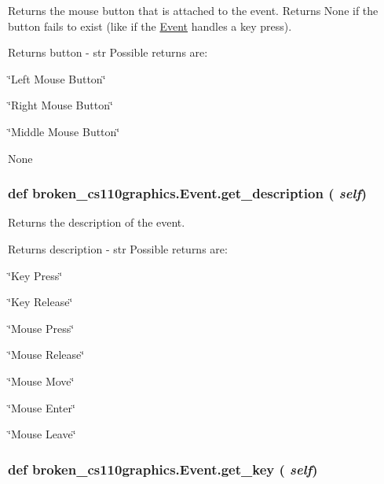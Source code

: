 Returns the mouse button that is attached to the event. Returns None if the button fails to exist (like if the \hyperlink{classbroken__cs110graphics_1_1Event}{Event} handles a key press). \begin{DoxyReturn}{Returns}
button -\/ str Possible returns are:
\begin{DoxyItemize}
\item \char`\"{}Left Mouse Button\char`\"{}
\item \char`\"{}Right Mouse Button\char`\"{}
\item \char`\"{}Middle Mouse Button\char`\"{}
\item None 
\end{DoxyItemize}
\end{DoxyReturn}
\hypertarget{classbroken__cs110graphics_1_1Event_a47c288b956b80e4670efe13d68aeb72b}{
\subsubsection[{get\_\-description}]{\setlength{\rightskip}{0pt plus 5cm}def broken\_\-cs110graphics.Event.get\_\-description ( {\em self})}}
\label{classbroken__cs110graphics_1_1Event_a47c288b956b80e4670efe13d68aeb72b}


Returns the description of the event. \begin{DoxyReturn}{Returns}
description -\/ str Possible returns are:
\begin{DoxyItemize}
\item \char`\"{}Key Press\char`\"{}
\item \char`\"{}Key Release\char`\"{}
\item \char`\"{}Mouse Press\char`\"{}
\item \char`\"{}Mouse Release\char`\"{}
\item \char`\"{}Mouse Move\char`\"{}
\item \char`\"{}Mouse Enter\char`\"{}
\item \char`\"{}Mouse Leave\char`\"{} 
\end{DoxyItemize}
\end{DoxyReturn}
\hypertarget{classbroken__cs110graphics_1_1Event_a92e6643c15f663845f0615eb40a6e72c}{
\subsubsection[{get\_\-key}]{\setlength{\rightskip}{0pt plus 5cm}def broken\_\-cs110graphics.Event.get\_\-key ( {\em self})}}
\label{classbroken__cs110graphics_1_1Event_a92e6643c15f663845f0615eb40a6e72c}


